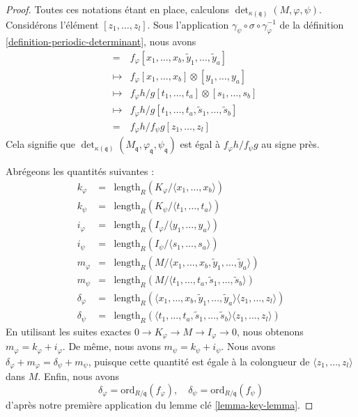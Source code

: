 \begin{proof}
\medskip\noindent
Toutes ces
notations étant en place, calculons $\det_{\kappa(\mathfrak q)}(M, \varphi, \psi)$.
Considérons l'élément $[z_1, \ldots, z_l]$.
Sous l'application $\gamma_\psi \circ \sigma \circ \gamma_\varphi^{-1}$
de la définition \ref{definition-periodic-determinant}, nous avons
\begin{eqnarray*}
[z_1, \ldots, z_l] & = &
f_\varphi [x_1, \ldots, x_b, \tilde y_1, \ldots, \tilde y_a] \\
& \mapsto & f_\varphi [x_1, \ldots, x_b] \otimes [y_1, \ldots, y_a] \\
& \mapsto &
f_\varphi h/g [t_1, \ldots, t_a] \otimes [s_1, \ldots, s_b] \\
& \mapsto &
f_\varphi h/g [t_1, \ldots, t_a, \tilde s_1, \ldots, \tilde s_b] \\
& = &
f_\varphi h/f_\psi g [z_1, \ldots, z_l]
\end{eqnarray*}
Cela signifie que
$\det_{\kappa(\mathfrak q)}
(M_{\mathfrak q}, \varphi_{\mathfrak q}, \psi_{\mathfrak q})$
est égal à $f_\varphi h/f_\psi g$ au signe près.

\medskip\noindent
Abrégeons les quantités suivantes :
\begin{eqnarray*}
k_\varphi & = & \text{length}_R(K_\varphi/\langle x_1, \ldots, x_b\rangle) \\
k_\psi    & = & \text{length}_R(K_\psi/\langle t_1, \ldots, t_a\rangle) \\
i_\varphi & = & \text{length}_R(I_\varphi/\langle y_1, \ldots, y_a\rangle) \\
i_\psi    & = & \text{length}_R(I_\psi/\langle s_1, \ldots, s_a\rangle) \\
m_\varphi & = & \text{length}_R(M/
\langle x_1, \ldots, x_b, \tilde y_1, \ldots, \tilde y_a\rangle) \\
m_\psi    & = & \text{length}_R(M/
\langle t_1, \ldots, t_a, \tilde s_1, \ldots, \tilde s_b\rangle) \\
\delta_\varphi & = & \text{length}_R(
\langle x_1, \ldots, x_b, \tilde y_1, \ldots, \tilde y_a\rangle
\langle z_1, \ldots, z_l\rangle) \\
\delta_\psi & = & \text{length}_R(
\langle t_1, \ldots, t_a, \tilde s_1, \ldots, \tilde s_b\rangle
\langle z_1, \ldots, z_l\rangle)
\end{eqnarray*}
En utilisant les suites exactes $0 \to K_\varphi \to M \to I_\varphi \to 0$,
nous obtenons $m_\varphi = k_\varphi + i_\varphi$. De même, nous avons
$m_\psi = k_\psi + i_\psi$. Nous avons
$\delta_\varphi + m_\varphi = \delta_\psi + m_\psi$, puisque cette quantité
est égale à la colongueur de $\langle z_1, \ldots, z_l \rangle$
dans $M$. Enfin, nous avons
$$
\delta_\varphi = \text{ord}_{R/\mathfrak q}(f_\varphi),
\quad
\delta_\psi = \text{ord}_{R/\mathfrak q}(f_\psi)
$$
d'après notre première application du lemme clé \ref{lemma-key-lemma}.


\end{proof}
